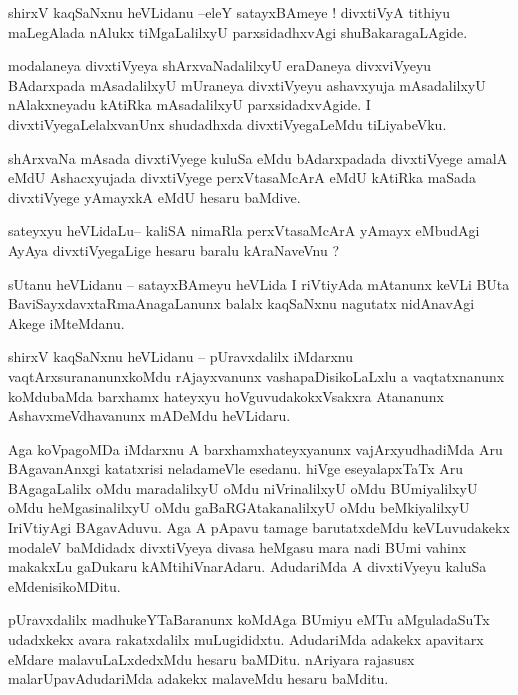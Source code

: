 \documentclass{article}
\begin{document}
\begin{mn}%
shirxV kaqSaNxnu heVLidanu --eleY satayxBAmeye ! divxtiVyA tithiyu maLegAlada nAlukx tiMgaLalilxyU 
parxsidadhxvAgi shuBakaragaLAgide. 
\end{mn}

\begin{mn}%
modalaneya divxtiVyeya shArxvaNadalilxyU eraDaneya divxviVyeyu BAdarxpada mAsadalilxyU mUraneya 
divxtiVyeyu ashavxyuja mAsadalilxyU nAlakxneyadu kAtiRka mAsadalilxyU parxsidadxvAgide. I 
divxtiVyegaLelalxvanUnx shudadhxda divxtiVyegaLeMdu tiLiyabeVku.
\end{mn}

\begin{mn}%
shArxvaNa mAsada divxtiVyege kuluSa eMdu bAdarxpadada divxtiVyege amalA eMdU Ashacxyujada 
divxtiVyege perxVtasaMcArA eMdU kAtiRka maSada divxtiVyege yAmayxkA eMdU hesaru baMdive. 
\end{mn}

\begin{mn}%
sateyxyu heVLidaLu-- kaliSA nimaRla perxVtasaMcArA yAmayx eMbudAgi AyAya divxtiVyegaLige hesaru 
baralu kAraNaveVnu ?
\end{mn}

\begin{mn}%
sUtanu heVLidanu -- satayxBAmeyu heVLida I riVtiyAda mAtanunx keVLi BUta 
BaviSayxdavxtaRmaAnagaLanunx balalx kaqSaNxnu nagutatx nidAnavAgi Akege iMteMdanu.
\end{mn}

\begin{mn}%
shirxV kaqSaNxnu heVLidanu -- pUravxdalilx iMdarxnu vaqtArxsurananunxkoMdu rAjayxvanunx 
vashapaDisikoLaLxlu a vaqtatxnanunx koMdubaMda barxhamx hateyxyu hoVguvudakokxVsakxra Atananunx 
AshavxmeVdhavanunx mADeMdu heVLidaru.
\end{mn}

\begin{mn}%
Aga koVpagoMDa iMdarxnu A barxhamxhateyxyanunx vajArxyudhadiMda Aru BAgavanAnxgi katatxrisi 
neladameVle esedanu. hiVge eseyalapxTaTx Aru BAgagaLalilx oMdu maradalilxyU oMdu niVrinalilxyU 
oMdu BUmiyalilxyU oMdu heMgasinalilxyU oMdu gaBaRGAtakanalilxyU oMdu beMkiyalilxyU IriVtiyAgi 
BAgavAduvu. Aga A pApavu tamage barutatxdeMdu keVLuvudakekx modaleV baMdidadx divxtiVyeya divasa 
heMgasu mara nadi BUmi vahinx makakxLu gaDukaru kAMtihiVnarAdaru. AdudariMda A divxtiVyeyu kaluSa 
eMdenisikoMDitu.
\end{mn}

\begin{mn}%
pUravxdalilx madhukeYTaBaranunx koMdAga BUmiyu eMTu aMguladaSuTx udadxkekx avara rakatxdalilx 
muLugididxtu. AdudariMda adakekx apavitarx eMdare malavuLaLxdedxMdu hesaru baMDitu. nAriyara 
rajasusx malarUpavAdudariMda adakekx malaveMdu hesaru baMditu.
\end{mn}
\end{document}
